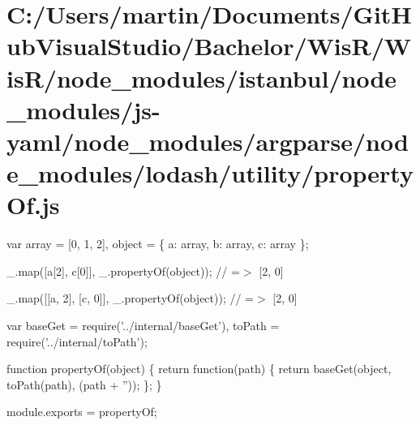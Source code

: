 \hypertarget{_c_1_2_users_2martin_2_documents_2_git_hub_visual_studio_2_bachelor_2_wis_r_2_wis_r_2node_module90d9190dd7eb53d6aa102fdf1b12888f}{}\section{C\+:/\+Users/martin/\+Documents/\+Git\+Hub\+Visual\+Studio/\+Bachelor/\+Wis\+R/\+Wis\+R/node\+\_\+modules/istanbul/node\+\_\+modules/js-\/yaml/node\+\_\+modules/argparse/node\+\_\+modules/lodash/utility/property\+Of.\+js}
var array = \mbox{[}0, 1, 2\mbox{]}, object = \{ \textquotesingle{}a\textquotesingle{}\+: array, \textquotesingle{}b\textquotesingle{}\+: array, \textquotesingle{}c\textquotesingle{}\+: array \};

\+\_\+.\+map(\mbox{[}\textquotesingle{}a\mbox{[}2\mbox{]}\textquotesingle{}, \textquotesingle{}c\mbox{[}0\mbox{]}\textquotesingle{}\mbox{]}, \+\_\+.\+property\+Of(object)); // =$>$ \mbox{[}2, 0\mbox{]}

\+\_\+.\+map(\mbox{[}\mbox{[}\textquotesingle{}a\textquotesingle{}, \textquotesingle{}2\textquotesingle{}\mbox{]}, \mbox{[}\textquotesingle{}c\textquotesingle{}, \textquotesingle{}0\textquotesingle{}\mbox{]}\mbox{]}, \+\_\+.\+property\+Of(object)); // =$>$ \mbox{[}2, 0\mbox{]}


\begin{DoxyCodeInclude}
var baseGet = require(\textcolor{stringliteral}{'../internal/baseGet'}),
    toPath = require(\textcolor{stringliteral}{'../internal/toPath'});

\textcolor{keyword}{function} propertyOf(\textcolor{keywordtype}{object}) \{
  \textcolor{keywordflow}{return} \textcolor{keyword}{function}(path) \{
    \textcolor{keywordflow}{return} baseGet(\textcolor{keywordtype}{object}, toPath(path), (path + \textcolor{stringliteral}{''}));
  \};
\}

module.exports = propertyOf;
\end{DoxyCodeInclude}
 